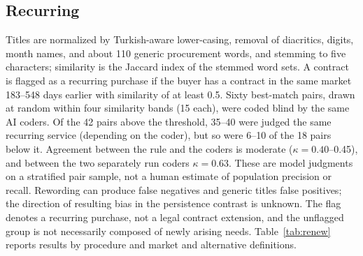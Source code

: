 \documentclass[11pt,a4paper]{article}
\begin{document}
\subsection{Recurring}
Titles are normalized by Turkish-aware lower-casing, removal of diacritics, digits, month names, and about 110 generic procurement words, and stemming to five characters; similarity is the Jaccard index of the stemmed word sets. A contract is flagged as a recurring purchase if the buyer has a contract in the same market 183--548 days earlier with similarity of at least 0.5. Sixty best-match pairs, drawn at random within four similarity bands (15 each), were coded blind by the same AI coders. Of the 42 pairs above the threshold, 35--40 were judged the same recurring service (depending on the coder), but so were 6--10 of the 18 pairs below it. Agreement between the rule and the coders is moderate ($\kappa=0.40$--0.45), and between the two separately run coders $\kappa=0.63$. These are model judgments on a stratified pair sample, not a human estimate of population precision or recall. Rewording can produce false negatives and generic titles false positives; the direction of resulting bias in the persistence contrast is unknown. The flag denotes a recurring purchase, not a legal contract extension, and the unflagged group is not necessarily composed of newly arising needs. Table~\ref{tab:renew} reports results by procedure and market and alternative definitions.
\end{document}
